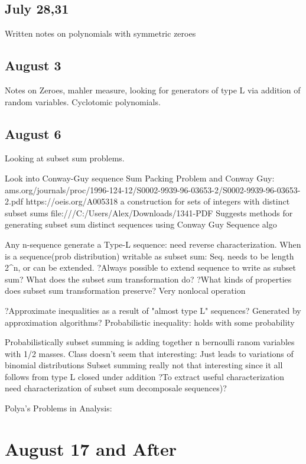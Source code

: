 \documentclass[11pt]{article}
\theoremstyle{remark}
\begin{document}
\subsection{July 28,31}

Written notes on polynomials with symmetric zeroes

\subsection{August 3}

Notes on Zeroes, mahler measure, looking for generators of type L via addition of random variables. Cyclotomic polynomials.

\subsection{August 6}

Looking at subset sum problems. 

Look into Conway-Guy sequence
Sum Packing Problem and Conway Guy: ams.org/journals/proc/1996-124-12/S0002-9939-96-03653-2/S0002-9939-96-03653-2.pdf
https://oeis.org/A005318
a construction for sets of integers with distinct subset sums
file:///C:/Users/Alex/Downloads/1341-PDF%
	Suggests methods for generating subset sum distinct sequences using Conway Guy Sequence algo
	
Any n-sequence generate a Type-L sequence: need reverse characterization. When is a sequence(prob distribution) writable as subset sum:
	Seq. needs to be length 2^n, or can be extended. 
	?Always possible to extend sequence to write as subset sum?
	What does the subset sum transformation do?
	?What kinds of properties does subset sum transformation preserve?
		Very nonlocal operation
		
	
?Approximate inequalities as a result of "almost type L" sequences?
	Generated by approximation algorithms?
	Probabilistic inequality: holds with some probability
	
	
Probabilistically subset summing is adding together n bernoulli ranom variables with 1/2 masses. 
	Class doesn't seem that interesting: Just leads to variations of binomial distributions
	Subset summing really not that interesting since it all follows from type L closed under addition
	?To extract useful characterization need characterization of subset sum decomposale sequences)?
	

Polya's Problems in Analysis:

\section{August 17 and After}
\end{document}

